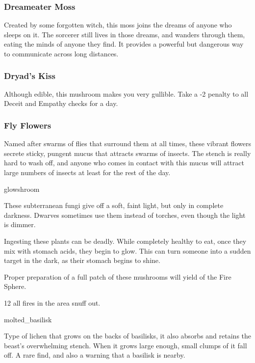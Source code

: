 \begin{multicols}{2}
\subsubsection{Dreameater Moss}
\label{dreameater_moss}
Created by some forgotten witch, this moss joins the dreams of anyone who sleeps on it.
The sorcerer still lives in those dreams, and wanders through them, eating the minds of anyone they find.
It provides a powerful but dangerous way to communicate across long distances.

\subsubsection{Dryad's Kiss}
\label{dryads_kiss}

Although edible, this mushroom makes you very gullible.
Take a -2 penalty to all Deceit and Empathy checks for a day.

\subsubsection{Fly Flowers}
\label{fly_flowers}

Named after swarms of flies that surround them at all times, these vibrant flowers secrete sticky, pungent mucus that attracts swarms of insects.
The stench is really hard to wash off, and anyone who comes in contact with this mucus will attract large numbers of insects at least for the rest of the day.

%
  {glowshroom}%
  {
   These subterranean fungi give off a soft, faint light, but only in complete darkness.
   Dwarves sometimes use them instead of torches, even though the light is dimmer.

   Ingesting these plants can be deadly.
   While completely healthy to eat, once they mix with stomach acids, they begin to glow.
   This can turn someone into a sudden target in the dark, as their stomach begins to shine.

   Proper preparation of a full patch of these mushrooms will yield  of the Fire Sphere.
    }
  {}%
  {12}%
  {all fires in the \gls{area} snuff out.}%

%
  {molted_basilisk}%
  {
  Type of lichen that grows on the backs of basilisks, it also absorbs and retains the beast's overwhelming stench.
  When it grows large enough, small clumps of it fall off.
  A rare find, and also a warning that a basilisk is nearby.

}
\end{multicols}
